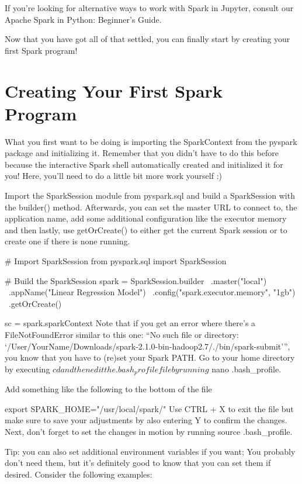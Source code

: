 \documentclass[a4paper,12pt]{article}
\begin{document}
If you’re looking for alternative ways to work with Spark in Jupyter, consult our Apache Spark in Python: Beginner’s Guide.

Now that you have got all of that settled, you can finally start by creating your first Spark program!

\section*{Creating Your First Spark Program}
What you first want to be doing is importing the SparkContext from the pyspark package and initializing it. Remember that you didn’t have to do this before because the interactive Spark shell automatically created and initialized it for you! Here, you’ll need to do a little bit more work yourself :)

Import the SparkSession module from pyspark.sql and build a SparkSession with the builder() method. Afterwards, you can set the master URL to connect to, the application name, add some additional configuration like the executor memory and then lastly, use getOrCreate() to either get the current Spark session or to create one if there is none running.

# Import SparkSession
from pyspark.sql import SparkSession

# Build the SparkSession
spark = SparkSession.builder \
   .master("local") \
   .appName("Linear Regression Model") \
   .config("spark.executor.memory", "1gb") \
   .getOrCreate()
   
sc = spark.sparkContext
Note that if you get an error where there’s a FileNotFoundError similar to this one: “No such file or directory: ‘/User/YourName/Downloads/spark-2.1.0-bin-hadoop2.7/./bin/spark-submit’”, you know that you have to (re)set your Spark PATH. Go to your home directory by executing $ cd and then edit the .bash_profile file by running $ nano .bash_profile.

Add something like the following to the bottom of the file

export SPARK_HOME="/usr/local/spark/"
Use CTRL + X to exit the file but make sure to save your adjustments by also entering Y to confirm the changes. Next, don’t forget to set the changes in motion by running source .bash_profile.

Tip: you can also set additional environment variables if you want; You probably don’t need them, but it’s definitely good to know that you can set them if desired. Consider the following examples:
\end{document}
